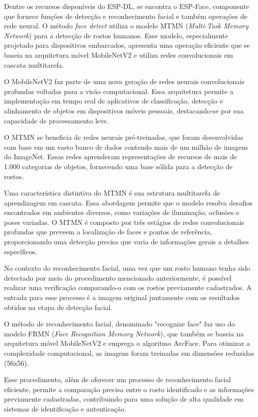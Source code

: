 Dentre os recursos disponíveis do ESP-DL, se encontra o 
ESP-Face, componente que fornece funções de detecção e 
reconhecimento facial e também operações de rede neural. 
O método \textit{face detect} utiliza o modelo MTMN (\textit{Multi-Task 
Memory Network}) para a detecção de rostos humanos. 
Esse modelo, especialmente projetado para dispositivos 
embarcados, apresenta uma operação eficiente que se 
baseia na arquitetura móvel MobileNetV2 e utiliza 
redes convolucionais em cascata multitarefa.

O MobileNetV2 faz parte de uma nova geração de redes 
neurais convolucionais profundas voltadas para a 
visão computacional. Essa arquitetura permite a 
implementação em tempo real de aplicativos de 
classificação, detecção e alinhamento de objetos 
em dispositivos móveis pessoais, destacando-se por 
sua capacidade de processamento leve.

O MTMN se beneficia de redes neurais pré-treinadas, 
que foram desenvolvidas com base em um vasto banco de 
dados contendo mais de um milhão de imagens do ImageNet. 
Essas redes aprenderam representações de recursos de 
mais de 1.000 categorias de objetos, fornecendo uma 
base sólida para a detecção de rostos.

Uma característica distintiva do MTMN é sua estrutura 
multitarefa de aprendizagem em cascata. Essa abordagem 
permite que o modelo resolva desafios encontrados em 
ambientes diversos, como variações de iluminação, 
oclusões e poses variadas. O MTMN é composto por três 
estágios de redes convolucionais profundas que preveem a 
localização de faces e pontos de referência, proporcionando 
uma detecção precisa que varia de informações gerais a 
detalhes específicos.

No contexto do reconhecimento facial, uma vez que um rosto 
humano tenha sido detectado por meio do procedimento 
mencionado anteriormente, é possível realizar uma verificação 
comparando-o com os rostos previamente cadastrados. 
A entrada para esse processo é a imagem original juntamente 
com os resultados obtidos na etapa de detecção facial.

O método de reconhecimento facial, denominado "recognize face" 
faz uso do modelo FRMN (\textit{Face Recognition Memory Network}), que 
também se baseia na arquitetura móvel MobileNetV2 e emprega o 
algoritmo ArcFace. Para otimizar a complexidade computacional, 
as imagens foram treinadas em dimensões reduzidas (56x56).

Esse procedimento, além de oferecer um processo de reconhecimento 
facial eficiente, permite a comparação precisa entre o rosto 
identificado e as informações previamente cadastradas, 
contribuindo para uma solução de alta qualidade em sistemas 
de identificação e autenticação.

